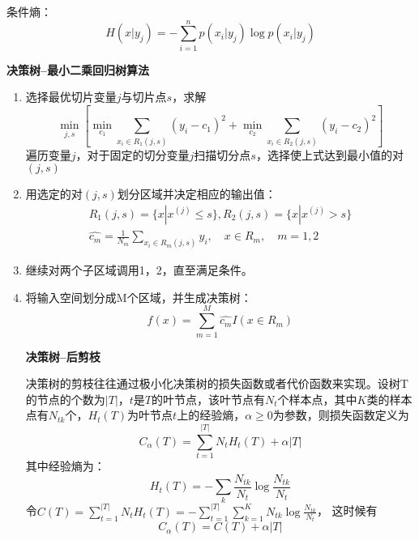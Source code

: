 \documentclass[10pt,a4paper]{ctexbook}
\begin{document}
条件熵：
\[
H(x|y_{j})=-\sum\limits_{i=1}^{n}{p(x_{i}|y_{j})\log{p(x_{i}|y_{j})}}
\]


\textbf{决策树--最小二乘回归树算法}
\begin{enumerate}
\item 选择最优切片变量$j$与切片点$s$，求解
\[
\min\limits_{j,s}\left[\min\limits_{c_1}{\sum\limits_{x_i \in R_{1}{(j,s)}}{(y_{i}-c_{1})^2}}+\min\limits_{c_2}{\sum\limits_{x_{i} \in R_{2}{(j,s)}}{(y_{i}-c_{2})^2}}\right]
\]
遍历变量$j$，对于固定的切分变量$j$扫描切分点$s$，选择使上式达到最小值的对$(j,s)$

\item 用选定的对$(j,s)$划分区域并决定相应的输出值：
\[
\begin{aligned}
R_{1}{(j,s)}=\{x|x^{(j)} \le s \}, R_{2}{(j,s)}=\{x|x^{(j)} > s \}\\
\hat{c_{m}}=\frac{1}{N_{m}}\sum\limits_{x_{i} \in R_{m}{(j,s)}}{y_{i}}, \quad x \in R_{m}, \quad m=1,2
\end{aligned}
\]


\item 继续对两个子区域调用1，2，直至满足条件。
\item 将输入空间划分成M个区域，并生成决策树：
\[
f(x)=\sum\limits_{m=1}^{M}{\hat{c_m}I(x \in R_{m})}
\]

\textbf{决策树--后剪枝}

决策树的剪枝往往通过极小化决策树的损失函数或者代价函数来实现。设树T的节点的个数为$|T|$，$t$是$T$的叶节点，该叶节点有$N_{t}$个样本点，其中$K$类的样本点有$N_{tk}$个，$H_{t}{(T)}$为叶节点$t$上的经验熵，$\alpha \ge 0$为参数，则损失函数定义为
\[
C_{\alpha}{(T)}=\sum\limits_{t=1}^{|T|}{N_{t}H_{t}{(T)}+\alpha|T|}
\]
其中经验熵为：
\[
H_{t}{(T)}=-\sum\limits_{k}{\frac{N_{tk}}{N_{t}}\log \frac{N_{tk}}{N_{t}}}
\]
令$C(T)=\sum\limits_{t=1}^{|T|}{N_{t}H_{t}{(T)}}=-\sum\limits_{t=1}^{|T|}\sum\limits_{k=1}^{K}{N_{tk}\log \frac{N_{tk}}{N_{t}}}$， 这时候有
\[
C_{\alpha}{(T)}=C(T)+\alpha |T|
\]






\end{enumerate}




\ifx\mlbook\undefined
    
\end{document}
